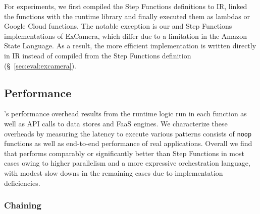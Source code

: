  For \name{} experiments, we
 first compiled the Step Functions definitions to \name{} IR, linked the
 functions with the \name{} runtime library and finally executed them as
 lambdas or Google Cloud functions. The notable exception is our \name{} and
 Step Functions implementations of ExCamera, which differ due to a limitation
 in the Amazon State Language. As a result, the more efficient \name
 {} implementation is written directly in \name{} IR instead of compiled from
 the Step Functions definition (\S~\ref{sec:eval:excamera}).

\subsection{Performance}\label{sec:eval:micro}

\name{}'s performance overhead results from the \name{} runtime logic run in
each function as well as API calls to data stores and FaaS engines. We
characterize these overheads by measuring the latency to execute various
patterns consists of \texttt{noop} functions as well as end-to-end performance
of real applications. Overall we find that \name{} performs comparably or
significantly better than Step Functions in most cases owing to higher
parallelism and a more expressive orchestration language, with modest slow
downs in the remaining cases due to implementation deficiencies.

\subsubsection{Chaining}\label{sec:eval:chain}

